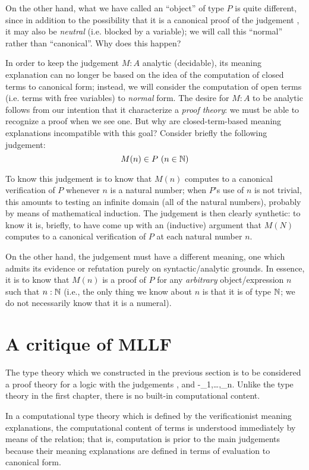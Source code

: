 \documentclass[main.tex]{subfiles}
\begin{document}
On the other hand, what we have called an ``object'' of type $P$ is quite
different, since in addition to the possibility that it is a canonical proof of
the judgement , it may also be \emph{neutral} (i.e. blocked by a
variable); we will call this ``normal'' rather than ``canonical''. Why does
this happen?

In order to keep the judgement $M:A$ analytic (decidable), its meaning
explanation can no longer be based on the idea of the computation of closed
terms to canonical form; instead, we will consider the computation of open
terms (i.e. terms with free variables) to \emph{normal} form. The desire for
$M:A$ to be analytic follows from our intention that it characterize a
\emph{proof theory}: we must be able to recognize a proof when we see one. But
why are closed-term-based meaning explanations incompatible with this goal?
Consider briefly the following judgement:
\[
  M(n) \in P\ (n\in\mathbb{N})
\]

To know this judgement is to know that $M(n)$ computes to a canonical
verification of $P$ whenever $n$ is a natural number; when $P$'s use of $n$ is
not trivial, this amounts to testing an infinite domain (all of the natural
numbers), probably by means of mathematical induction. The judgement is then
clearly synthetic: to know it is, briefly, to have come up with an (inductive)
argument that $M(N)$ computes to a canonical verification of $P$ at each
natural number $n$.

On the other hand, the judgement  must have a
different meaning, one which admits its evidence or refutation purely on
syntactic/analytic grounds. In essence, it is to know that $M(n)$ is a proof of
$P$ for any \emph{arbitrary} object/expression $n$ such that $n:\mathbb{N}$
(i.e., the only thing we know about $n$ is that it is of type $\mathbb{N}$; we
do not necessarily know that it is a numeral).


\section{A critique of \textbf{MLLF}}

The type theory which we constructed in the previous section is to be
considered a proof theory for a logic with the judgements , 
and \hyp{}{_1,\dots,_n}. Unlike the type
theory in the first chapter, there is no built-in computational content.

In a computational type theory which is defined by the verificationist meaning
explanations, the computational content of terms is understood immediately by
means of the  relation; that is, computation is prior to the main
judgements because their meaning explanations are defined in terms of
evaluation to canonical form.
\end{document}
